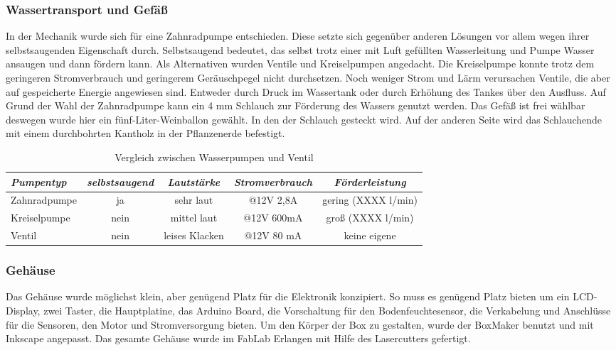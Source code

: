 \documentclass[]{IEEEtran}
\begin{document}
	\subsubsection{Wassertransport und Gefäß}
	In der Mechanik wurde sich für eine Zahnradpumpe entschieden. Diese setzte sich gegenüber anderen Lösungen vor allem wegen ihrer selbstsaugenden Eigenschaft durch. Selbstsaugend bedeutet, das selbst trotz einer mit Luft gefüllten Wasserleitung und Pumpe Wasser ansaugen und dann fördern kann. Als Alternativen wurden Ventile und Kreiselpumpen angedacht. Die Kreiselpumpe konnte trotz dem geringeren Stromverbrauch und geringerem Geräuschpegel nicht durchsetzen. Noch weniger Strom und Lärm verursachen Ventile, die aber auf gespeicherte Energie angewiesen sind. Entweder durch Druck im Wassertank oder durch Erhöhung des Tankes über den Ausfluss. Auf Grund der Wahl der Zahnradpumpe kann ein 4 mm Schlauch zur Förderung des Wassers genutzt werden. Das Gefäß ist frei wählbar deswegen wurde hier ein fünf-Liter-Weinballon gewählt. In den der Schlauch gesteckt wird. Auf der anderen Seite wird das Schlauchende mit einem durchbohrten Kantholz in der Pflanzenerde befestigt.
	\begin{table*}[!h]
	

	\begin{tabular}{|lcccc|}
	\hline
	\textit{Pumpentyp} & \textit{selbstsaugend} & \textit{Lautstärke} & \textit{Stromverbrauch} & \textit{Förderleistung} \\ \hline
	Zahnradpumpe & ja & sehr laut & @12V 2,8A & gering (XXXX l/min)\\
	Kreiselpumpe & nein & mittel laut & @12V 600mA & groß (XXXX l/min)\\
	Ventil & nein & leises Klacken & @12V 80 mA & keine eigene \\
	\hline
	\end{tabular}
	\caption{Vergleich zwischen Wasserpumpen und Ventil}
	\label{Vergleich zwischen Wasserpumpen und Ventil}
	
\end{table*}	%
	\subsubsection{Gehäuse}
	Das Gehäuse wurde möglichst klein, aber genügend Platz für die Elektronik konzipiert.
	So muss es genügend Platz bieten um ein LCD-Display, zwei Taster, die Hauptplatine, das Arduino Board,  die Vorschaltung für den Bodenfeuchtesensor, die Verkabelung und Anschlüsse für die Sensoren, den Motor und Stromversorgung  bieten.
	Um den Körper der Box zu gestalten, wurde der BoxMaker benutzt und mit Inkscape angepasst. 
	Das gesamte Gehäuse wurde im FabLab Erlangen mit Hilfe des Lasercutters gefertigt.
	
\end{document}
